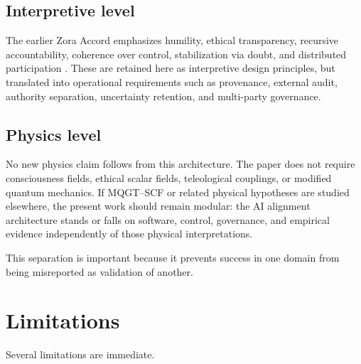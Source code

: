 \documentclass[11pt]{article}
\begin{document}
\subsection{Interpretive level}

The earlier Zora Accord emphasizes humility, ethical transparency, recursive accountability, coherence over control, stabilization via doubt, and distributed participation \cite{baird2026archive}. These are retained here as interpretive design principles, but translated into operational requirements such as provenance, external audit, authority separation, uncertainty retention, and multi-party governance.

\subsection{Physics level}

No new physics claim follows from this architecture. The paper does not require consciousness fields, ethical scalar fields, teleological couplings, or modified quantum mechanics. If MQGT--SCF or related physical hypotheses are studied elsewhere, the present work should remain modular: the AI alignment architecture stands or falls on software, control, governance, and empirical evidence independently of those physical interpretations.

This separation is important because it prevents success in one domain from being misreported as validation of another.

\section{Limitations}

Several limitations are immediate.
\end{document}

